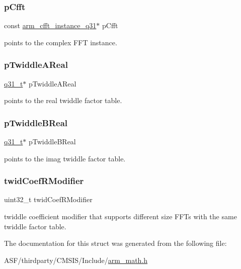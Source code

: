 \subsubsection{\texorpdfstring{pCfft}{pCfft}}
{\footnotesize\ttfamily const \mbox{\hyperlink{structarm__cfft__instance__q31}{arm\+\_\+cfft\+\_\+instance\+\_\+q31}}$\ast$ p\+Cfft}

points to the complex F\+FT instance. \mbox{\label{structarm__rfft__instance__q31_a059faa282f9186687d843ead4a7a0d7e}} 
\subsubsection{\texorpdfstring{pTwiddleAReal}{pTwiddleAReal}}
{\footnotesize\ttfamily \mbox{\hyperlink{arm__math_8h_adc89a3547f5324b7b3b95adec3806bc0}{q31\+\_\+t}}$\ast$ p\+Twiddle\+A\+Real}

points to the real twiddle factor table. \mbox{\label{structarm__rfft__instance__q31_a611c385424ce77519f599980f96d5846}} 
\subsubsection{\texorpdfstring{pTwiddleBReal}{pTwiddleBReal}}
{\footnotesize\ttfamily \mbox{\hyperlink{arm__math_8h_adc89a3547f5324b7b3b95adec3806bc0}{q31\+\_\+t}}$\ast$ p\+Twiddle\+B\+Real}

points to the imag twiddle factor table. \mbox{\label{structarm__rfft__instance__q31_a5b06f7f76c018db993fe6acc5708c589}} 
\subsubsection{\texorpdfstring{twidCoefRModifier}{twidCoefRModifier}}
{\footnotesize\ttfamily uint32\+\_\+t twid\+Coef\+R\+Modifier}

twiddle coefficient modifier that supports different size F\+F\+Ts with the same twiddle factor table. 

The documentation for this struct was generated from the following file\+:\begin{DoxyCompactItemize}
\item 
A\+S\+F/thirdparty/\+C\+M\+S\+I\+S/\+Include/\mbox{\hyperlink{arm__math_8h}{arm\+\_\+math.\+h}}\end{DoxyCompactItemize}
